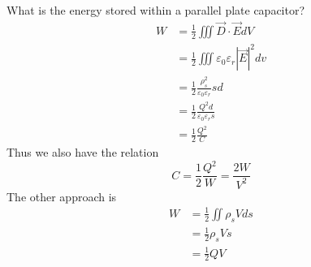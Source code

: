 \documentclass[12pt]{article}
\begin{document}
\begin{ex}
	What is the energy stored within a parallel plate capacitor? \\
	\begin{align*}
		W &= \frac{1}{2} \iiint \vec{D}\cdot\vec{E}dV \\
		  &= \frac{1}{2} \iiint \varepsilon_0\varepsilon_r |\vec{E}|^2dv \\
		  &= \frac{1}{2}\frac{\rho_s^2}{\varepsilon_0\varepsilon_r}sd \\
		  &= \frac{1}{2} \frac{Q^2d}{\varepsilon_0\varepsilon_rs} \\
		  &= \frac{1}{2} \frac{Q^2}{C}
	\end{align*}
	Thus we also have the relation
	$$C = \frac{1}{2} \frac{Q^2}{W} = \frac{2W}{V^2}$$
	The other approach is
	\begin{align*}
		W &= \frac{1}{2} \iint\rho_sVds \\
		  &= \frac{1}{2} \rho_sVs \\
		  &= \frac{1}{2} QV
	\end{align*}
\end{ex}
\end{document}
